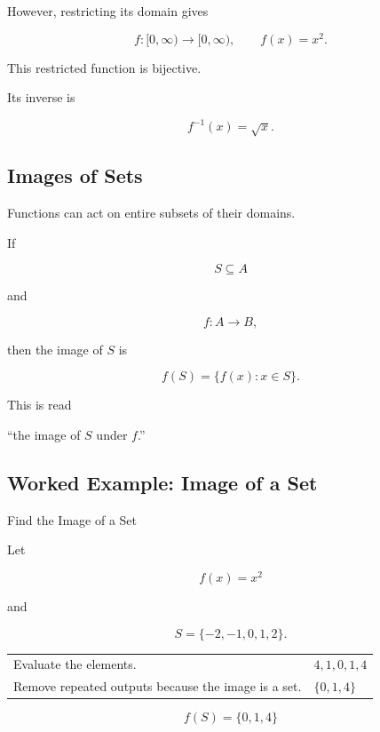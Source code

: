 However, restricting its domain gives

\[ f:[0,\infty)\to[0,\infty),\qquad f(x)=x^2. \]

This restricted function is bijective.

Its inverse is

\[ f^{-1}(x)=\sqrt x. \]

\subsection{Images of Sets}
\label{subsec:images-of-sets}

Functions can act on entire subsets of their domains.

If

\[ S\subseteq A \]

and

\[ f:A\to B, \]

then the image of \(S\) is

\[ f(S)=\{f(x):x\in S\}. \]

This is read

\begin{center}
``the image of \(S\) under \(f\).''
\end{center}

\subsection{Worked Example: Image of a Set}
\label{subsec:worked-image-set}

\begin{workedexamplebox}{Find the Image of a Set}

Let

\[ f(x)=x^2 \]

and

\[ S=\{-2,-1,0,1,2\}. \]

\begin{tabularx}{\textwidth}{@{}>{\raggedright\arraybackslash}p{}X@{}}
Evaluate the elements. & \(4,1,0,1,4\)\\
Remove repeated outputs because the image is a set. & \(\{0,1,4\}\)
\end{tabularx}

\begin{answerbox}
\[ f(S)=\{0,1,4\} \]
\end{answerbox}
\end{workedexamplebox}

